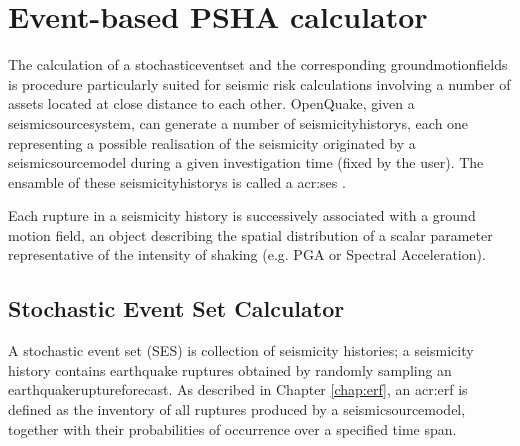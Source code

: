 %
\section{Event-based PSHA calculator}
\label{chap:stochastic_psha}
%
The calculation of a \gls{stochasticeventset}  
and the corresponding \glspl{groundmotionfield} is procedure particularly 
suited for seismic risk calculations involving a number of assets located 
at close distance to each other.
%
OpenQuake, given a \gls{seismicsourcesystem}, can generate a number of 
\glspl{seismicityhistory}, each one representing a possible realisation of 
the seismicity originated by a \gls{seismicsourcemodel} during a given 
investigation time (fixed by the user). 
%
The ensamble of these \glspl{seismicityhistory} is called a 
\gls{acr:ses} .

Each rupture in a seismicity history is successively associated with a ground
motion field, an object describing the spatial distribution of a scalar 
parameter representative of the intensity of shaking (e.g. PGA or Spectral 
Acceleration). 
%
\subsection{Stochastic Event Set Calculator}
A stochastic event set (SES) is collection of seismicity histories; a 
seismicity history contains earthquake ruptures obtained by randomly 
sampling an \gls{earthquakeruptureforecast}. 
%
As described in Chapter \ref{chap:erf}, an \gls{acr:erf} is defined 
as the inventory of all ruptures produced by a \gls{seismicsourcemodel}, 
together with their probabilities of occurrence over a specified time span.

